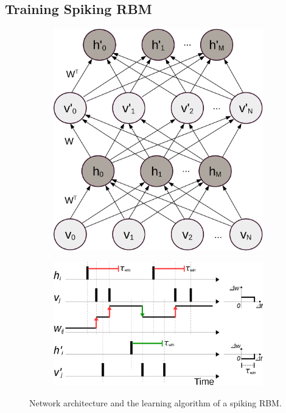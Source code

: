 \subsection{Training Spiking RBM}
\label{subsec:exp_SRBM}
\begin{figure}[h]
	\centering
	\begin{subfigure}[c]{0.33\textwidth}
		\includegraphics[width=\textwidth]{pics_sdlm/rbm.png}
	\end{subfigure}
	\begin{subfigure}[c]{0.66\textwidth}
		\includegraphics[width=\textwidth]{pics_sdlm/rSTDP_rbm.png}
	\end{subfigure}
	\caption{Network architecture and the learning algorithm of a spiking RBM.}
	\label{fig:sRBM}
\end{figure}

